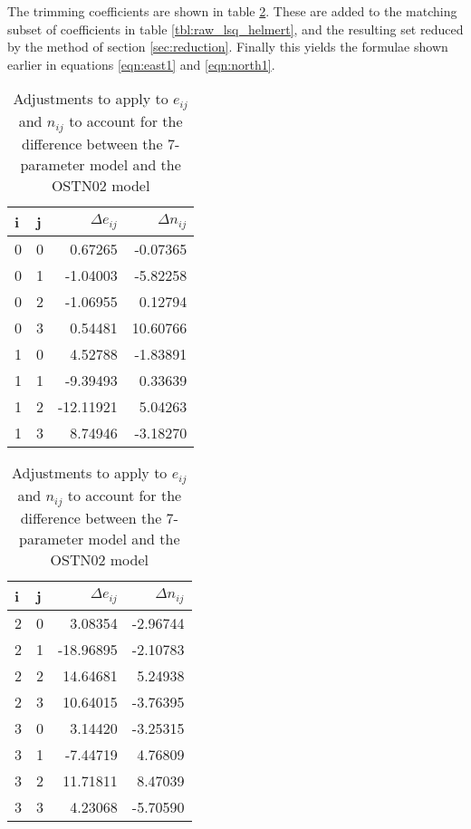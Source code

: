 \documentclass[10pt,a4paper]{article}
\begin{document}
The trimming coefficients are shown in table \ref{tbl:trim_helmert_ostn02}.
These are added to the matching subset of coefficients in table
\ref{tbl:raw_lsq_helmert}, and the resulting set reduced by the method of
section \ref{sec:reduction}.  Finally this yields the formulae shown earlier in
equations \eqref{eqn:east1} and \eqref{eqn:north1}.

\begin{table}
  \centering
\begin{tabular}{l l r r}
\toprule
\textbf{i} & \textbf{j} & $\Delta{}e_{ij}$ & $\Delta{}n_{ij}$ \\
\midrule
0 & 0 &         0.67265 &        -0.07365 \\
0 & 1 &        -1.04003 &        -5.82258 \\
0 & 2 &        -1.06955 &         0.12794 \\
0 & 3 &         0.54481 &        10.60766 \\
1 & 0 &         4.52788 &        -1.83891 \\
1 & 1 &        -9.39493 &         0.33639 \\
1 & 2 &       -12.11921 &         5.04263 \\
1 & 3 &         8.74946 &        -3.18270 \\
\bottomrule
\end{tabular}
\quad\quad
\begin{tabular}{l l r r}
\toprule
\textbf{i} & \textbf{j} & $\Delta{}e_{ij}$ & $\Delta{}n_{ij}$ \\
\midrule
2 & 0 &         3.08354 &        -2.96744 \\
2 & 1 &       -18.96895 &        -2.10783 \\
2 & 2 &        14.64681 &         5.24938 \\
2 & 3 &        10.64015 &        -3.76395 \\
3 & 0 &         3.14420 &        -3.25315 \\
3 & 1 &        -7.44719 &         4.76809 \\
3 & 2 &        11.71811 &         8.47039 \\
3 & 3 &         4.23068 &        -5.70590 \\
\bottomrule
\end{tabular}
\caption{Adjustments to apply to $e_{ij}$ and $n_{ij}$ to account for the difference between the 7-parameter model and the OSTN02 model}
\label{tbl:trim_helmert_ostn02}
\hrulefill
\end{table}
\end{document}
